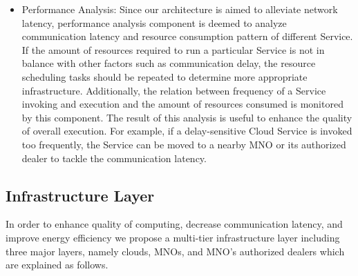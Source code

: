 \documentclass[conference]{IEEEtran}
\begin{document}
\begin{itemize}
\item Performance Analysis:
Since our architecture is aimed to alleviate network latency, performance analysis component is deemed to analyze communication latency and resource consumption pattern of different Service. If the amount of resources required to run a particular Service is not in balance with other factors such as communication delay, the resource scheduling tasks should be repeated to determine more appropriate infrastructure. Additionally, the relation between frequency of a Service invoking and execution and the amount of resources consumed is monitored by this component. The result of this analysis is useful to enhance the quality of overall execution. For example, if a delay-sensitive Cloud Service is invoked too frequently, the Service can be moved to a nearby MNO or its authorized dealer to tackle the communication latency.
\end{itemize}

\subsection{Infrastructure Layer}
In order to enhance quality of computing, decrease communication latency, and improve energy efficiency we propose a multi-tier infrastructure layer including three major layers, namely clouds, MNOs, and MNO's authorized dealers which are explained as follows. 
\end{document}
